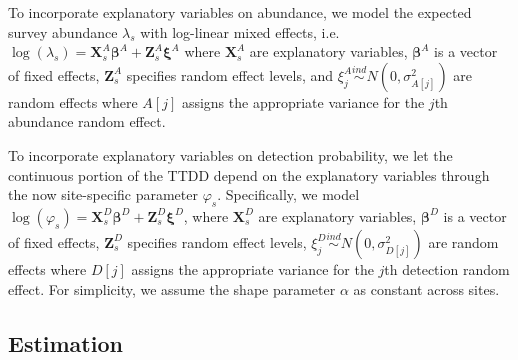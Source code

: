 \documentclass[12pt]{article}
\newcommand{\vX}{\textbf{X}}
\newcommand{\vZ}{\textbf{Z}}
\newcommand{\vbeta}{\boldsymbol{\beta}}
\newcommand{\vxi}{\boldsymbol{\xi}}
\newcommand{\ind}{\stackrel{ind}{\sim}}
\begin{document}
To incorporate explanatory variables on abundance, we model the expected survey abundance $\lambda_{s}$ with log-linear mixed effects, i.e. $\log (\lambda_{s}) = \vX_{s}^A\vbeta^A + \vZ_{s}^A\vxi^A$ where $\vX_{s}^A$ are explanatory variables, $\vbeta^A$ is a vector of fixed effects, $\vZ_{s}^A$ specifies random effect levels, and $\xi_j^A \ind N(0,\sigma_{A[j]}^2)$ are random effects where $A[j]$ assigns the appropriate variance for the $j$th abundance random effect.  

To incorporate explanatory variables on detection probability, we let the continuous portion of the TTDD depend on the explanatory variables through the now site-specific parameter $\varphi_s$. 
Specifically, we model $\log(\varphi_{s}) = \vX_{s}^D\vbeta^D + \vZ_{s}^D\vxi^D$, where $\vX_{s}^D$ are explanatory variables, $\vbeta^D$ is a vector of fixed effects, $\vZ_{s}^D$ specifies random effect levels, $\xi_j^D \ind N(0,\sigma_{D[j]}^2)$ are random effects where $D[j]$ assigns the appropriate variance for the $j$th detection random effect.  
For simplicity, we assume the shape parameter $\alpha$ as constant across sites.



\subsection{Estimation}
\end{document}
